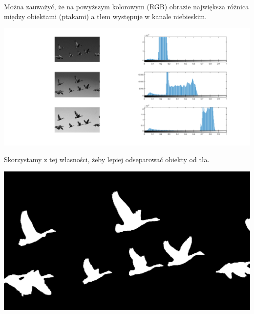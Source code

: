 \documentclass{article}
\begin{document}
	Można zauważyć, że na powyższym kolorowym (RGB) obrazie największa różnica między obiektami (ptakami) a tłem występuje w kanale niebieskim.
	\begin{center}
		\includegraphics[width=\linewidth]{../../lab06/ptaki_rgb.png}
	\end{center}
	Skorzystamy z tej własności, żeby lepiej odseparować obiekty od tła.
	
	\begin{center}
		\includegraphics[width=\linewidth]{../../lab06/ptaki_bim.png}
	\end{center}
\end{document}
